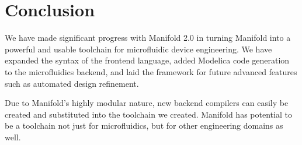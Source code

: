 \section{Conclusion}

We have made significant progress with Manifold 2.0 in turning Manifold into a powerful and usable
toolchain for microfluidic device engineering. We have expanded the syntax of the frontend language,
added Modelica code generation to the microfluidics backend, and laid the framework for future
advanced features such as automated design refinement.

Due to Manifold's highly modular nature, new backend compilers can easily be created and substituted
into the toolchain we created. Manifold has potential to be a toolchain not just for microfluidics,
but for other engineering domains as well.
